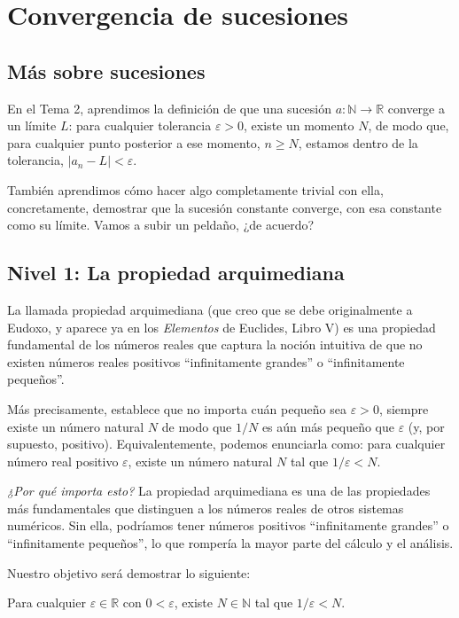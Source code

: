 \chapter{Convergencia de sucesiones}

\section{Más sobre sucesiones}

En el Tema 2, aprendimos la definición de que una sucesión $a : \mathbb{N} \to \mathbb{R}$ converge a un límite $L$: para cualquier tolerancia $\varepsilon > 0$, existe un momento $N$, de modo que, para cualquier punto posterior a ese momento, $n \ge N$, estamos dentro de la tolerancia, $|a_n - L| < \varepsilon$.

También aprendimos cómo hacer algo completamente trivial con ella, concretamente, demostrar que la sucesión constante converge, con esa constante como su límite. Vamos a subir un peldaño, ¿de acuerdo?

\section{Nivel 1: La propiedad arquimediana}

La llamada propiedad arquimediana (que creo que se debe originalmente a Eudoxo, y aparece ya en los \textit{Elementos} de Euclides, Libro V) es una propiedad fundamental de los números reales que captura la noción intuitiva de que no existen números reales positivos ``infinitamente grandes'' o ``infinitamente pequeños''.

Más precisamente, establece que no importa cuán pequeño sea $\varepsilon > 0$, siempre existe un número natural $N$ de modo que $1/N$ es aún más pequeño que $\varepsilon$ (y, por supuesto, positivo). Equivalentemente, podemos enunciarla como: para cualquier número real positivo $\varepsilon$, existe un número natural $N$ tal que $1/\varepsilon < N$.

\textit{¿Por qué importa esto?} La propiedad arquimediana es una de las propiedades más fundamentales que distinguen a los números reales de otros sistemas numéricos. Sin ella, podríamos tener números positivos ``infinitamente grandes'' o ``infinitamente pequeños'', lo que rompería la mayor parte del cálculo y el análisis.

Nuestro objetivo será demostrar lo siguiente:
\begin{theorem}[PropArq]
  Para cualquier $\varepsilon \in \mathbb{R}$ con $0 < \varepsilon$, existe $N \in \mathbb{N}$ tal que $1/\varepsilon < N$.
\end{theorem}

